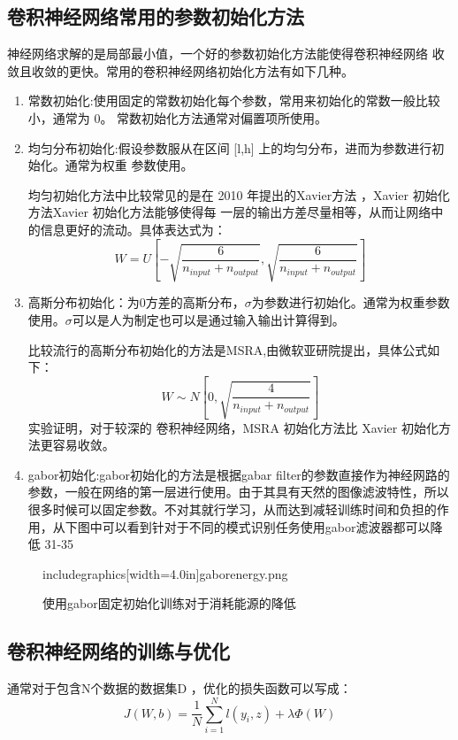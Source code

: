 \subsection{卷积神经网络常用的参数初始化方法}
神经网络求解的是局部最小值，一个好的参数初始化方法能使得卷积神经网络 收敛且收敛的更快。常用的卷积神经网络初始化方法有如下几种。
\begin{enumerate}
\item 常数初始化:使用固定的常数初始化每个参数，常用来初始化的常数一般比较小，通常为 0。 常数初始化方法通常对偏置项所使用。
\item 均匀分布初始化:假设参数服从在区间 [l,h] 上的均匀分布，进而为参数进行初始化。通常为权重 参数使用。

均匀初始化方法中比较常见的是在 2010 年提出的Xavier\cite{XAVIER}方法 ，Xavier 初始化方法Xavier 初始化方法能够使得每 一层的输出方差尽量相等，从而让网络中的信息更好的流动。具体表达式为：
\begin{equation}{
W=U\left [ -\sqrt{\frac{6}{n_{input}+n_{output}}}, \sqrt{\frac{6}{n_{input}+n_{output}}} \right ]
}
\end{equation}

\item 高斯分布初始化：为0方差的高斯分布，$\sigma$为参数进行初始化。通常为权重参数使用。$\sigma$可以是人为制定也可以是通过输入输出计算得到。

比较流行的高斯分布初始化的方法是MSRA\cite{MSRA},由微软亚研院提出，具体公式如下：
\begin{equation}{
W \sim N\left [ 0, \sqrt{\frac{4}{n_{input}+n_{output}}}\right ]
}
\end{equation}
实验证明，对于较深的 卷积神经网络，MSRA 初始化方法比 Xavier 初始化方法更容易收敛。
\item gabor初始化\cite{GABOR}:gabor初始化的方法是根据gabar filter的参数直接作为神经网路的参数，一般在网络的第一层进行使用。由于其具有天然的图像滤波特性，所以很多时候可以固定参数。不对其就行学习，从而达到减轻训练时间和负担的作用，从下图中可以看到针对于不同的模式识别任务使用gabor滤波器都可以降低 31-35%
\end{enumerate}
\begin{figure}
includegraphics[width=4.0in]{gaborenergy.png}
\caption{使用gabor固定初始化训练对于消耗能源的降低}
\end{figure}

\subsection{卷积神经网络的训练与优化}
 通常对于包含N个数据的数据集D ，优化的损失函数可以写成：
\begin{equation}{
J(W,b)=\frac{1}{N}\sum_{i=1}^{N}l(y_i,z)+\lambda \Phi (W)
}
\end{equation}



